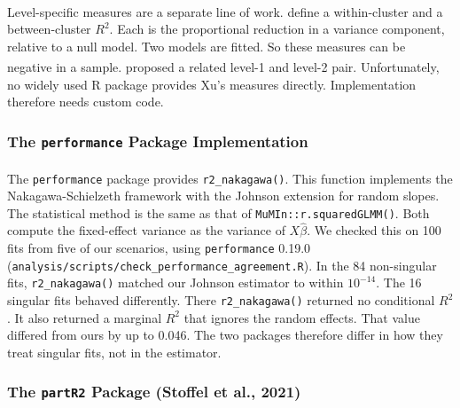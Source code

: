 \documentclass[
  11pt,
]{article}
\begin{document}
Level-specific measures are a separate line of work.\textsuperscript{} define a within-cluster and a between-cluster
\(R^2\). Each is the proportional reduction in a variance component,
relative to a null model. Two models are fitted. So these
measures can be negative in a sample\textsuperscript{}.\textsuperscript{} proposed a related
level-1 and level-2 pair. Unfortunately, no widely used R package
provides Xu's measures directly. Implementation therefore needs
custom code.

\subsubsection{\texorpdfstring{The \texttt{performance} Package Implementation}{The performance Package Implementation}}\label{the-performance-package-implementation}

The \texttt{performance} package\textsuperscript{}
provides \texttt{r2\_nakagawa()}. This function implements the
Nakagawa-Schielzeth framework with the Johnson extension for
random slopes. The statistical method is the same as that of
\texttt{MuMIn::r.squaredGLMM()}. Both compute the fixed-effect variance
as the variance of \(X\hat\beta\). We checked this on 100 fits from
five of our scenarios, using \texttt{performance} 0.19.0
(\texttt{analysis/scripts/check\_performance\_agreement.R}). In the 84
non-singular fits, \texttt{r2\_nakagawa()} matched our Johnson estimator
to within \(10^{-14}\). The 16 singular fits behaved differently.
There \texttt{r2\_nakagawa()} returned no conditional \(R^2\). It also
returned a marginal \(R^2\) that ignores the random effects. That
value differed from ours by up to 0.046. The two packages
therefore differ in how they treat singular fits, not in the
estimator.

\subsubsection{\texorpdfstring{The \texttt{partR2} Package (Stoffel et al., 2021)}{The partR2 Package (Stoffel et al., 2021)}}\label{the-partr2-package-stoffel-et-al.-2021}
\end{document}
